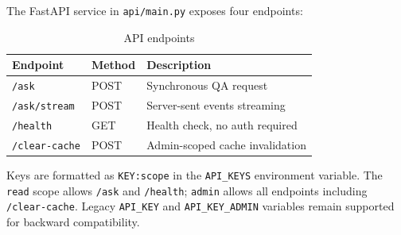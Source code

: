 The FastAPI service in \texttt{api/main.py} exposes four endpoints:

\begin{table}[htbp]
\centering
\caption{API endpoints}
\renewcommand{\arraystretch}{1.3}
\begin{tabular}{|l|l|l|}
\hline
\textbf{Endpoint} & \textbf{Method} & \textbf{Description} \\
\hline
\texttt{/ask} & POST & Synchronous QA request \\
\texttt{/ask/stream} & POST & Server-sent events streaming \\
\texttt{/health} & GET & Health check, no auth required \\
\texttt{/clear-cache} & POST & Admin-scoped cache invalidation \\
\hline
\end{tabular}
\end{table}

Keys are formatted as \texttt{KEY:scope} in the \texttt{API\_KEYS} environment variable. The \texttt{read} scope allows \texttt{/ask} and \texttt{/health}; \texttt{admin} allows all endpoints including \texttt{/clear-cache}. Legacy \texttt{API\_KEY} and \texttt{API\_KEY\_ADMIN} variables remain supported for backward compatibility.
